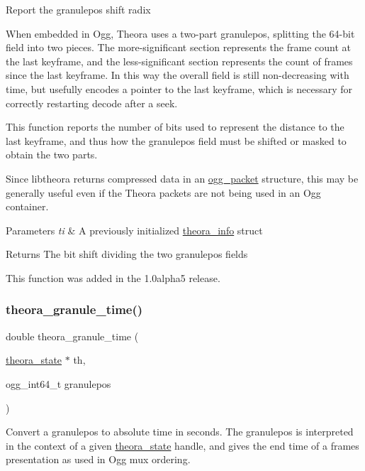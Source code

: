Report the granulepos shift radix

When embedded in Ogg, Theora uses a two-\/part granulepos, splitting the 64-\/bit field into two pieces. The more-\/significant section represents the frame count at the last keyframe, and the less-\/significant section represents the count of frames since the last keyframe. In this way the overall field is still non-\/decreasing with time, but usefully encodes a pointer to the last keyframe, which is necessary for correctly restarting decode after a seek.

This function reports the number of bits used to represent the distance to the last keyframe, and thus how the granulepos field must be shifted or masked to obtain the two parts.

Since libtheora returns compressed data in an \hyperlink{structogg__packet}{ogg\+\_\+packet} structure, this may be generally useful even if the Theora packets are not being used in an Ogg container.


\begin{DoxyParams}{Parameters}
{\em ti} & A previously initialized \hyperlink{structtheora__info}{theora\+\_\+info} struct \\
\hline
\end{DoxyParams}
\begin{DoxyReturn}{Returns}
The bit shift dividing the two granulepos fields
\end{DoxyReturn}
This function was added in the 1.\+0alpha5 release. \mbox{\label{group__oldfuncs_ga4376358b12b9fa23ce6fe21cb5c65ac6}} 
\subsubsection{\texorpdfstring{theora\+\_\+granule\+\_\+time()}{theora\_granule\_time()}}
{\footnotesize\ttfamily double theora\+\_\+granule\+\_\+time (\begin{DoxyParamCaption}\item[{\hyperlink{structtheora__state}{theora\+\_\+state} $\ast$}]{th,  }\item[{ogg\+\_\+int64\+\_\+t}]{granulepos }\end{DoxyParamCaption})}

Convert a granulepos to absolute time in seconds. The granulepos is interpreted in the context of a given \hyperlink{structtheora__state}{theora\+\_\+state} handle, and gives the end time of a frame\textquotesingle{}s presentation as used in Ogg mux ordering.


